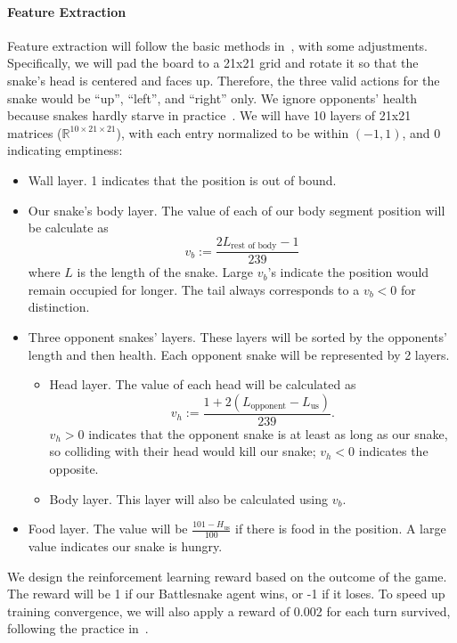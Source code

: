 \documentclass[conference]{IEEEtran}
\begin{document}
\paragraph{Feature Extraction}
Feature extraction will follow the basic methods
in~\cite{siddiqui2020multiagent,archinukmonte}, with some adjustments.
Specifically,
we will pad the board to a 21x21 grid and rotate it so that the snake's head is
centered and faces up. Therefore,
the three valid actions for the snake would be ``up'', ``left'',
and ``right'' only.
We ignore opponents' health because snakes hardly starve in
practice~\cite{siddiqui2020multiagent}.
We will have 10 layers of 21x21 matrices ($\mathbb R^{10\times21\times21}$),
with each entry normalized to be within $(-1,1)$, and 0 indicating emptiness:
\begin{itemize}
    \item Wall layer. 1 indicates that the position is out of bound.
    \item Our snake's body layer.
    The value of each of our body segment position will be calculate as $$
        v_b:=\frac{2L_{\text{rest of body}}-1}{239}
    $$ where $L$ is the length of the snake.
    Large $v_b$'s indicate the position would remain occupied for longer.
    The tail always corresponds to a $v_b<0$ for distinction.
    \item Three opponent snakes' layers.
    These layers will be sorted by the opponents' length and then health.
    Each opponent snake will be represented by 2 layers. \begin{itemize}
        \item Head layer. The value of each head will be calculated as $$
            v_h:=\frac{1+2(L_{\text{opponent}}-L_{\text{us}})}{239}.
        $$ $v_h>0$ indicates that the opponent snake is at least as
        long as our snake,
        so colliding with their head would kill our snake;
        $v_h<0$ indicates the opposite.
        \item Body layer. This layer will also be calculated using $v_b$.
    \end{itemize}
    \item Food layer.
    The value will be $\displaystyle\frac{101-H_{\text{us}}}{100}$ if
    there is food in the position.
    A large value indicates our snake is hungry.
\end{itemize}

We design the reinforcement learning reward based on the outcome of the game.
The reward will be 1 if our Battlesnake agent wins, or -1 if it loses.
To speed up training convergence,
we will also apply a reward of 0.002 for each turn survived,
following the practice in~\cite{chung2020battlesnake}.
\end{document}
